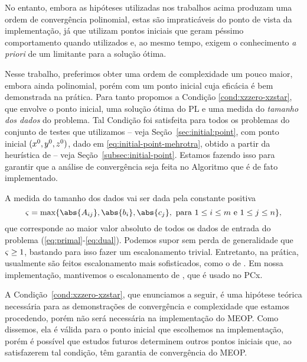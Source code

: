 No entanto, embora as hipóteses  utilizadas nos trabalhos acima produzam uma ordem de convergência  polinomial, estas são impraticáveis do ponto de vista da implementação, já que utilizam pontos iniciais que geram péssimo comportamento quando utilizados e, ao mesmo tempo, exigem o conhecimento \emph{a priori}  de um limitante para a solução  ótima. 

Nesse trabalho, preferimos  obter uma ordem de complexidade um pouco maior, embora ainda polinomial, porém com um ponto inicial cuja eficácia é bem demonstrada na prática. Para tanto propomos a Condição \ref{cond:xzzero-xzstar},  que envolve o ponto inicial, uma solução ótima do PL e uma medida do \emph{tamanho dos dados} do problema. Tal Condição foi satisfeita para todos os problemas do conjunto de testes que utilizamos  -- veja Seção~\ref{sec:initial:point}, com
ponto inicial $(x^0,y^0,z^0)$, dado em \eqref{eq:initial-point-mehrotra}, obtido a partir da heurística de \textcite{Mehrotra:1992wr} -- veja Seção~\ref{subsec:initial-point}. Estamos fazendo isso para garantir que a análise de convergência seja feita no  Algoritmo que é de fato implementado. 


A medida do tamanho dos dados vai ser dada pela constante positiva 
\begin{equation}
	\label{eq:max-norm-data}
 	\bdxzstar = \max\{\abs{A_{ij}},\abs{b_{i}},\abs{c_{j}}, \text{ para } 1\leq i\leq m \text{ e } 1\leq j \leq n  \},
\end{equation}
que corresponde ao maior valor absoluto de todos os dados de entrada do problema (\ref{eq:primal}-\ref{eq:dual}). Podemos supor sem perda de generalidade que $\varsigma \geq  1$,  bastando para isso fazer um escalonamento trivial. Entretanto, na prática, usualmente são feitos escalonamento mais sofisticados, como o de \textcite{Curtis:1972cp}. Em nossa implementação, mantivemos o escalonamento de \citeauthor{Curtis:1972cp}, que é  usado no PCx.


A Condição~\ref{cond:xzzero-xzstar}, que enunciamos a seguir, é uma hipótese teórica necessária para as demonstrações de convergência e complexidade que estamos procedendo, porém não será necessária na implementação do MEOP. Como dissemos, ela é válida para o ponto inicial que escolhemos na implementação, porém é possível que estudos futuros determinem outros pontos iniciais que, ao
satisfazerem tal condição, têm garantia de convergência do MEOP.



